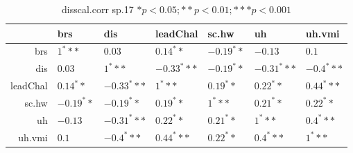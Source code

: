 \begin{table}[ht]
\centering
\begin{tabular}{rllllll}
  \hline
 & brs & dis & leadChal & sc.hw & uh & uh.vmi \\ 
  \hline
brs & $1^***$ & $0.03$ & $0.14^**$ & $-0.19^**$ & $-0.13$ & $0.1$ \\ 
  dis & $0.03$ & $1^***$ & $-0.33^***$ & $-0.19^**$ & $-0.31^***$ & $-0.4^***$ \\ 
  leadChal & $0.14^**$ & $-0.33^***$ & $1^***$ & $0.19^**$ & $0.22^**$ & $0.44^***$ \\ 
  sc.hw & $-0.19^**$ & $-0.19^**$ & $0.19^**$ & $1^***$ & $0.21^**$ & $0.22^**$ \\ 
  uh & $-0.13$ & $-0.31^***$ & $0.22^**$ & $0.21^**$ & $1^***$ & $0.4^***$ \\ 
  uh.vmi & $0.1$ & $-0.4^***$ & $0.44^***$ & $0.22^**$ & $0.4^***$ & $1^***$ \\ 
   \hline
\end{tabular}
\caption{disscal.corr sp.17 $* p < 0.05; ** p < 0.01; *** p < 0.001$} 
\end{table}
